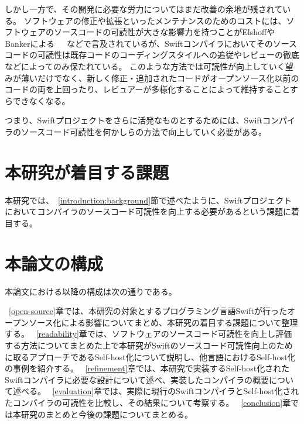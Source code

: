 しかし一方で、その開発に必要な労力についてはまだ改善の余地が残されている。
ソフトウェアの修正や拡張といったメンテナンスのためのコストには、ソフトウェアのソースコードの可読性が大きな影響力を持つことがElshoffやBankerによる~\cite{elshoff}~\cite{banker-datar}~\cite{banker-davis}などで言及されているが、Swiftコンパイラにおいてそのソースコードの可読性は既存コードのコーディングスタイルへの追従やレビューの徹底などによってのみ保たれている。
このような方法では可読性が向上していく望みが薄いだけでなく、新しく修正・追加されたコードがオープンソース化以前のコードの両を上回ったり、レビュアーが多様化することによって維持することすらできなくなる。

つまり、Swiftプロジェクトをさらに活発なものとするためには、Swiftコンパイラのソースコード可読性を何かしらの方法で向上していく必要がある。

\section{本研究が着目する課題}
\label{introduction:issue}

本研究では、~\ref{introduction:background}節で述べたように、Swiftプロジェクトにおいてコンパイラのソースコード可読性を向上する必要があるという課題に着目する。

\section{本論文の構成}

本論文における以降の構成は次の通りである。

~\ref{open-source}章では、本研究の対象とするプログラミング言語Swiftが行ったオープンソース化による影響についてまとめ、本研究の着目する課題について整理する。
~\ref{readability}章では、ソフトウェアのソースコード可読性を向上し評価する方法についてまとめた上で本研究がSwiftのソースコード可読性向上のために取るアプローチであるSelf-host化について説明し、他言語におけるSelf-host化の事例を紹介する。
~\ref{refinement}章では、本研究で実装するSelf-host化されたSwiftコンパイラに必要な設計について述べ、実装したコンパイラの概要について述べる。
~\ref{evaluation}章では、実際に現行のSwiftコンパイラとSelf-host化されたコンパイラの可読性を比較し、その結果について考察する。
~\ref{conclusion}章では本研究のまとめと今後の課題についてまとめる。

